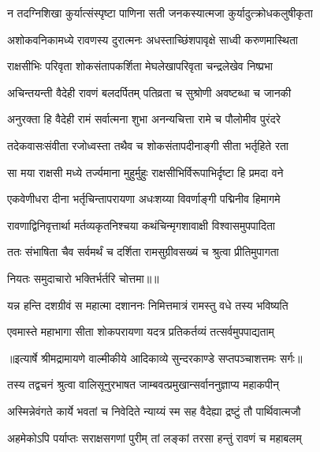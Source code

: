 \twolineshloka
{न तदग्निशिखा कुर्यात्संस्पृष्टा पाणिना सती}
{जनकस्यात्मजा कुर्यादुत्क्रोधकलुषीकृता} %

\twolineshloka
{अशोकवनिकामध्ये रावणस्य दुरात्मनः}
{अधस्ताच्छिंशपावृक्षे साध्वी करुणमास्थिता} %

\twolineshloka
{राक्षसीभिः परिवृता शोकसंतापकर्शिता}
{मेघलेखापरिवृता चन्द्रलेखेव निष्प्रभा} %

\twolineshloka
{अचिन्तयन्ती वैदेही रावणं बलदर्पितम्}
{पतिव्रता च सुश्रोणी अवष्टब्धा च जानकी} %

\twolineshloka
{अनुरक्ता हि वैदेही रामं सर्वात्मना शुभा}
{अनन्यचित्ता रामे च पौलोमीव पुरंदरे} %

\twolineshloka
{तदेकवासःसंवीता रजोध्वस्ता तथैव च}
{शोकसंतापदीनाङ्गी सीता भर्तृहिते रता} %

\twolineshloka
{सा मया राक्षसी मध्ये तर्ज्यमाना मुहुर्मुहुः}
{राक्षसीभिर्विरूपाभिर्दृष्टा हि प्रमदा वने} %

\twolineshloka
{एकवेणीधरा दीना भर्तृचिन्तापरायणा}
{अधःशय्या विवर्णाङ्गी पद्मिनीव हिमागमे} %

\twolineshloka
{रावणाद्विनिवृत्तार्था मर्तव्यकृतनिश्चया}
{कथंचिन्मृगशावाक्षी विश्वासमुपपादिता} %

\twolineshloka
{ततः संभाषिता चैव सर्वमर्थं च दर्शिता}
{रामसुग्रीवसख्यं च श्रुत्वा प्रीतिमुपागता} %

{नियतः समुदाचारो भक्तिर्भर्तरि चोत्तमा॥॥} %

\addtocounter{shlokacount}{1}

\twolineshloka
{यन्न हन्ति दशग्रीवं स महात्मा दशाननः}
{निमित्तमात्रं रामस्तु वधे तस्य भविष्यति} %

\twolineshloka
{एवमास्ते महाभागा सीता शोकपरायणा}
{यदत्र प्रतिकर्तव्यं तत्सर्वमुपपाद्यताम्} %


{॥इत्यार्षे श्रीमद्रामायणे वाल्मीकीये आदिकाव्ये सुन्दरकाण्डे सप्तपञ्चाशत्तमः सर्गः॥}


\twolineshloka
{तस्य तद्वचनं श्रुत्वा वालिसूनुरभाषत}
{जाम्बवत्प्रमुखान्सर्वाननुज्ञाप्य महाकपीन्} %

\twolineshloka
{अस्मिन्नेवंगते कार्ये भवतां च निवेदिते}
{न्याय्यं स्म सह वैदेह्या द्रष्टुं तौ पार्थिवात्मजौ} %

\twolineshloka
{अहमेकोऽपि पर्याप्तः सराक्षसगणां पुरीम्}
{तां लङ्कां तरसा हन्तुं रावणं च महाबलम्} %

